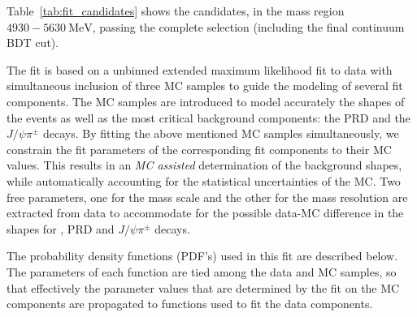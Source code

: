 Table~\ref{tab:fit_candidates} shows the \BpmKpmJpsi{} candidates, in the mass region
$4930-5630\ \mathrm{MeV}$, passing the complete selection (including the final
continuum BDT cut). 

\begin{table}[!htb]
    \begin{center}
	\label{tab:fit_candidates}
    \end{center}
\end{table}

The fit is based on a unbinned extended maximum likelihood fit to data
with simultaneous inclusion of three MC samples to guide the modeling of
several fit components.
The MC samples are introduced to model accurately the shapes of the \BpmKpmJpsi{} 
events as well as the most critical background components: the PRD and the
$J/\psi\pi^\pm$ decays.
By fitting the above mentioned MC samples simultaneously, we constrain the
fit parameters of the corresponding fit components to their MC values.
This results in an \textit{MC assisted} determination of the background shapes,
while automatically accounting for the statistical uncertainties of the MC.
Two free parameters, one for the mass scale and the other for the mass resolution
are extracted from data to accommodate for the possible data-MC difference
in the shapes for \BpmKpmJpsi{}, PRD and $J/\psi\pi^\pm$ decays.

The probability density functions (PDF's) used in this fit are described
below. The parameters of each function are tied among the data and MC samples,
so that effectively the parameter values that are determined by the fit
on the MC components are propagated to functions used to fit the data
components.

